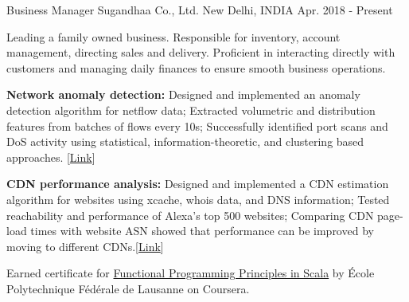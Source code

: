
\begin{cventries}

  \cventry
    {Business Manager} %
    {Sugandhaa Co., Ltd.} %
    {New Delhi, INDIA} %
    {Apr. 2018 - Present} %
    {
      \begin{cvitems} %
      \item {Leading a family owned business. Responsible for inventory, account management, directing sales and delivery. Proficient in interacting directly with customers and managing daily finances to ensure smooth business operations.}
    \item {\textbf{Network anomaly detection:} Designed and implemented an anomaly detection algorithm for netflow data; Extracted volumetric and distribution features from batches of flows every 10s; Successfully identified port scans and DoS activity using statistical, information-theoretic, and clustering based approaches. \hfill [\href{https://github.com/shahifaqeer/netflow-anomaly-detector}{Link}]}
    \item {\textbf{CDN performance analysis:} Designed and implemented a CDN estimation algorithm for websites using xcache, whois data, and DNS information; Tested reachability and performance of Alexa's top 500 websites; Comparing CDN page-load times with website ASN showed that performance can be improved by moving to different CDNs.\hfill [\href{https://github.com/shahifaqeer/cdn-analysis}{Link}]}
     \item {Earned certificate for \href{https://www.coursera.org/account/accomplishments/certificate/V2LQXVYEBCJ4?utm_medium=certificate&utm_source=link&utm_campaign=copybutton_certificate}{Functional Programming Principles in Scala} by École Polytechnique Fédérale de Lausanne on Coursera.}
      \end{cvitems}
    }


\end{cventries}
